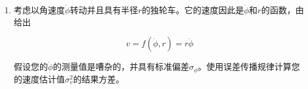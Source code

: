 \begin{enumerate}
\item 考虑以角速度$\dot{\phi}$转动并且具有半径$r$的独轮车。它的速度因此是$\dot{\phi}$和$r$的函数，由给出

\begin{equation}
\nonumber
v=f(\dot{\phi},r)=r\dot{\phi}
\end{equation} 

假设您的$\dot{\phi}$的测量值是嘈杂的，并具有标准偏差$\sigma_{\phi}$。使用误差传播规律计算您的速度估计值$\sigma_v^2$的结果方差。

\end{enumerate}
\normalsize
